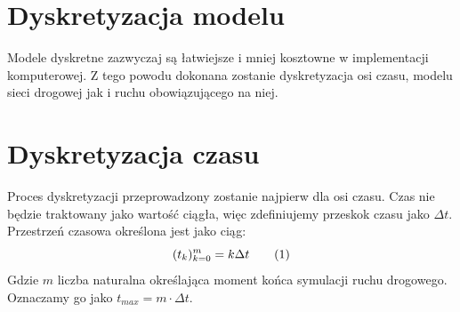 \documentclass[12pt]{book}
\newcommand\addtag{\refstepcounter{equation}\tag{\theequation}}
\begin{document}
%
%
%

\section{Dyskretyzacja modelu}
Modele dyskretne zazwyczaj są łatwiejsze i mniej kosztowne w implementacji komputerowej. Z tego powodu dokonana zostanie dyskretyzacja osi czasu, modelu sieci drogowej jak i ruchu obowiązującego na niej.
\section{Dyskretyzacja czasu}
Proces dyskretyzacji przeprowadzony zostanie najpierw dla osi czasu. Czas nie będzie traktowany jako wartość ciągła, więc zdefiniujemy przeskok czasu jako $\Delta t$. Przestrzeń czasowa określona jest jako ciąg:
\[
(t_k)_{k=0}^m=k\Delta t \addtag
\]
Gdzie $m$ liczba naturalna określająca moment końca symulacji ruchu drogowego. Oznaczamy go jako $t_{max}=m \cdot \Delta t$.
\end{document}
